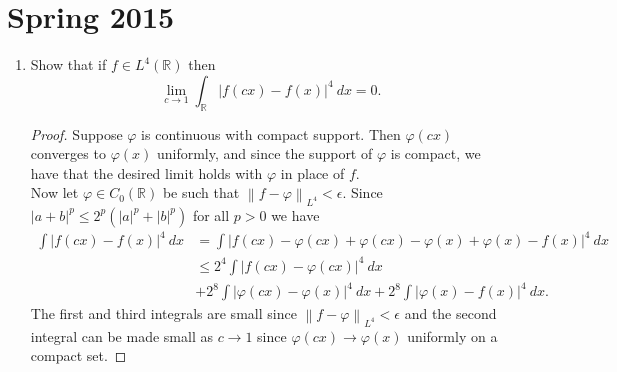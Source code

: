 \documentclass[11pt,letterpaper]{report}
\newcommand{\reals}{\mathbb{R}}
\newcommand{\Lp}[2]{\left\|{#1}\right\|_{L^{#2}}}
\begin{document}
\section{Spring 2015}
\begin{enumerate}
	\item Show that if $f\in L^4(\reals)$ then
	\[
	\lim_{c\to 1}\int_\reals|f(cx)-f(x)|^4\ dx = 0.
	\]
	\begin{proof}
		Suppose $\varphi$ is continuous with compact support. Then $\varphi(cx)$ converges to $\varphi(x)$ uniformly, and since the support of $\varphi$ is compact, we have that the desired limit holds with $\varphi$ in place of $f$.\\

		\noindent Now let $\varphi\in C_0(\reals)$ be such that $\Lp{f-\varphi}{4}<\epsilon$. Since $|a+b|^p \leq 2^p(|a|^p+|b|^p)$ for all $p>0$ we have
		\begin{align*}
			\int|f(cx)-f(x)|^4\ dx &= \int|f(cx)-\varphi(cx)+\varphi(cx)-\varphi(x)+\varphi(x)-f(x)|^4\ dx\\
			&\leq 2^4\int|f(cx)-\varphi(cx)|^4\ dx\\
			&+ 2^8\int|\varphi(cx)-\varphi(x)|^4\ dx + 2^8\int|\varphi(x)-f(x)|^4\ dx.
		\end{align*}
		The first and third integrals are small since $\Lp{f-\varphi}{4}<\epsilon$ and the second integral can be made small as $c\to 1$ since $\varphi(cx)\to \varphi(x)$ uniformly on a compact set.
	\end{proof}


\end{enumerate}
\end{document}
